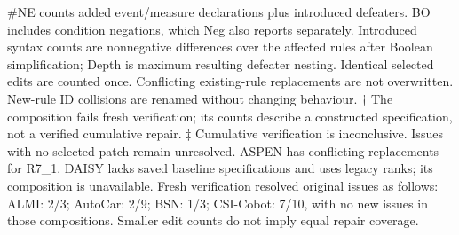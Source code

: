 \begin{table}[t]
\caption{Changes from the original specification to the stakeholder-corrected specification and to the composition of the recorded highest-ranked patches. -- denotes an unavailable composition. See notes for cumulative verification outcomes.}
\label{tab:corrected-comparison}
\centering\scriptsize
{}
\par\smallskip\parbox{\textwidth}{\footnotesize \#NE counts added event/measure declarations plus introduced defeaters. BO includes condition negations, which Neg also reports separately. Introduced syntax counts are nonnegative differences over the affected rules after Boolean simplification; Depth is maximum resulting defeater nesting. Identical selected edits are counted once. Conflicting existing-rule replacements are not overwritten. New-rule ID collisions are renamed without changing behaviour. $\dagger$ The composition fails fresh verification; its counts describe a constructed specification, not a verified cumulative repair. $\ddagger$ Cumulative verification is inconclusive. Issues with no selected patch remain unresolved. ASPEN has conflicting replacements for R7\_1. DAISY lacks saved baseline specifications and uses legacy ranks; its composition is unavailable. Fresh verification resolved original issues as follows: ALMI: 2/3; AutoCar: 2/9; BSN: 1/3; CSI-Cobot: 7/10, with no new issues in those compositions. Smaller edit counts do not imply equal repair coverage.}
\end{table}
